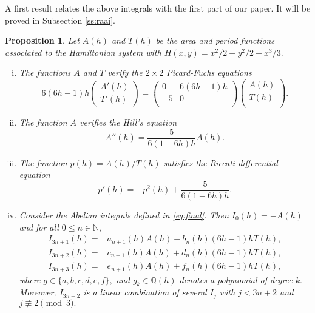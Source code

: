 \documentclass[12pt,a4paper,reqno]{amsart}
\newcommand{\N}{\mathbb{N}}
\newtheorem{prop}[teo]{Proposition}
\begin{document}
 A first result relates the above integrals with the first part
of our paper. It will be proved in Subsection \ref{ss:raai}.

\begin{prop}\label{pr:AT}  Let $A(h)$ and $T(h)$ be the area and
period functions associated to the Hamiltonian system with
$H(x,y)=x^2/2+y^2/2+x^3/3.$
        \begin{enumerate}[(i)]
\item  The functions $A$ and $T$ verify the $2\times2$ Picard-Fuchs
equations
\begin{equation*}
6(6h -1)h \left(\begin{array}{c}
 A'(h)  \\
T'(h)
\end{array}\right)=\left(
\begin{array}{cc}
0 & 6(6h -1)h\\
-5 & 0\\
\end{array}
\right)\left(
         \begin{array}{c}
           A(h)\\
           T(h)\\
         \end{array}
       \right).
\end{equation*}

\item The function $A$ verifies the Hill's equation
\begin{equation}\label{eq:hill-AT}
A''(h)=\frac5{6(1-6h)h} A(h).
\end{equation}

\item The function $p(h)=A(h)/T(h)$ satisfies the Riccati
differential equation
\begin{equation*}
p'(h)=-p^2(h)+\frac5{6(1-6h)h}.
\end{equation*}


\item Consider the  Abelian integrals defined in
        \eqref{eq:final}. Then $I_0(h)=-A(h)$ and
 for all $0\le n\in\N,$
\begin{align*}
I_{3n+1}(h)=& a_{n+1}(h)A(h)+b_{n}(h) (6h-1)h T(h),\\
I_{3n+2}(h)=& c_{n+1}(h)A(h)+d_{n}(h) (6h-1)h T(h),\\
I_{3n+3}(h)=& e_{n+1}(h)A(h)+f_{n}(h) (6h-1)h T(h),
\end{align*}
where $g\in\{a,b,c,d,e,f\},$ and $g_k\in\mathbb{Q}(h)$ denotes a
polynomial of degree $k.$ Moreover, $I_{3n+2}$ is a linear
combination of several $I_j$ with $j<3n+2$ and $j\not\equiv2 \pmod
3.$
\end{enumerate}
\end{prop}
\end{document}
